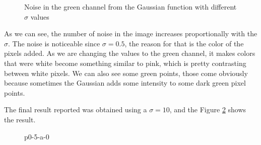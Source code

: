 \documentclass[12pt,a4paper]{article}
\begin{document}
\begin{figure}[!h]
	\caption{Noise in the green channel from the Gaussian function with different $\sigma$ values}%
	\label{fig:green-sigma}%
\end{figure}

As we can see, the number of noise in the image increases proportionally with the $\sigma$. The noise is noticeable since $\sigma = 0.5$, the reason for that is the color of the pixels added. As we are changing the values to the green channel, it makes colors that were white become something similar to pink, which is pretty contrasting between white pixels. We can also see some green points, those come obviously because sometimes the Gaussian adds some intensity to some dark green pixel points.

The final result reported was obtained using a  $\sigma = 10$, and the Figure \ref{fig:p0-5-a-0} shows the result.

\begin{figure}[!h]
	\centering
	{%
		\setlength{\fboxsep}{1pt}%
		\setlength{\fboxrule}{1pt}%
	}%
	\caption{p0-5-a-0}
	\label{fig:p0-5-a-0}
\end{figure}
\end{document}
